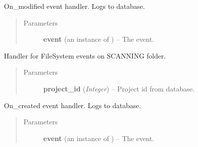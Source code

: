 \documentclass[letterpaper,10pt,english]{sphinxmanual}
\begin{document}
\begin{fulllineitems}
\begin{fulllineitems}
\begin{quote}
\begin{description}
\end{description}\end{quote}

\end{fulllineitems}


\begin{fulllineitems}
\label{controller:controller.handlers.PROJECT_FILE_EVENT_HANDLER.on_modified}
On\_modified event handler. Logs to database.
\begin{quote}\begin{description}
\item[{Parameters}] \leavevmode
\textbf{event} (an instance of ) -- The event.

\end{description}\end{quote}

\end{fulllineitems}


\end{fulllineitems}


\begin{fulllineitems}
\label{controller:controller.handlers.SCAN_HANDLER}
Handler for FileSystem events on SCANNING folder.
\begin{quote}\begin{description}
\item[{Parameters}] \leavevmode
\textbf{project\_id} (\emph{Integer}) -- Project id from database.

\end{description}\end{quote}

\begin{fulllineitems}
\label{controller:controller.handlers.SCAN_HANDLER.on_created}
On\_created event handler. Logs to database.
\begin{quote}\begin{description}
\item[{Parameters}] \leavevmode
\textbf{event} (an instance of ) -- The event.

\end{description}\end{quote}

\end{fulllineitems}


\end{fulllineitems}
\end{document}
